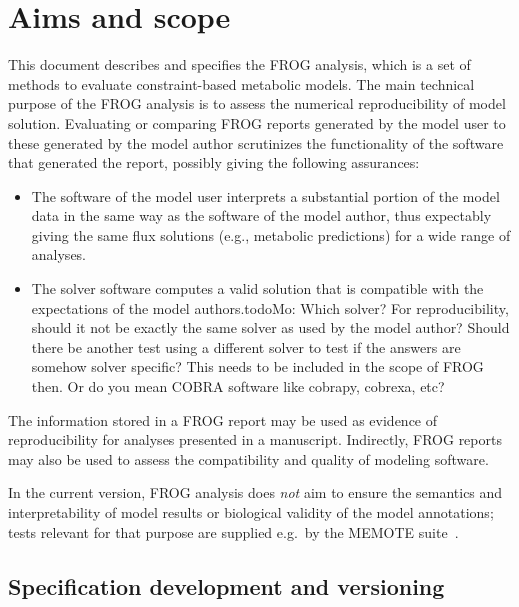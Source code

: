 
\section{Aims and scope}
\label{sec:aims}

This document describes and specifies the FROG analysis, which is a set of methods to evaluate constraint-based metabolic models. The main technical purpose of the FROG analysis is to assess the numerical reproducibility of model solution. Evaluating or comparing FROG reports generated by the model user to these generated by the model author scrutinizes the functionality of the software that generated the report, possibly giving the following assurances:
\begin{itemize}
\item The software of the model user interprets a substantial portion of the model data in the same way as the software of the model author, thus expectably giving the same flux solutions (e.g., metabolic predictions) for a wide range of analyses.
\item The solver software computes a valid solution that is compatible with the expectations of the model authors.todo{Mo: Which solver? For reproducibility, should it not be exactly the same solver as used by the model author? Should there be another test using a different solver to test if the answers are somehow solver specific? This needs to be included in the scope of FROG then. Or do you mean COBRA software like cobrapy, cobrexa, etc?}
\end{itemize}

The information stored in a FROG report may be used as evidence of reproducibility for analyses presented in a manuscript. Indirectly, FROG reports may also be used to assess the compatibility and quality of modeling software.

In the current version, FROG analysis does \emph{not} aim to ensure the semantics and interpretability of model results or biological validity of the model annotations; tests relevant for that purpose are supplied e.g.~by the MEMOTE suite~\cite{lieven2020memote}.

\subsection{Specification development and versioning}

